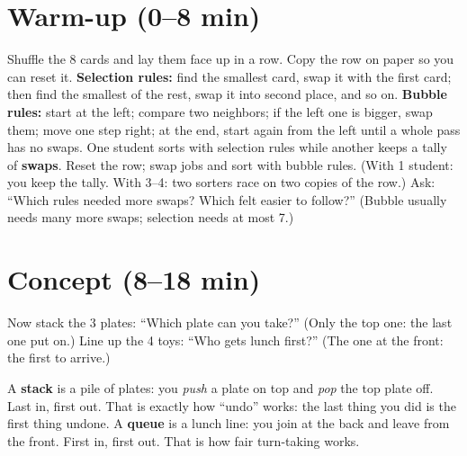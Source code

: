 \section{Warm-up (0--8 min)}
\begin{unplugged}
Shuffle the 8 cards and lay them face up in a row. Copy the row on paper so you can reset it.
\textbf{Selection rules:} find the smallest card, swap it with the first card; then find the smallest of the rest, swap it into second place, and so on.
\textbf{Bubble rules:} start at the left; compare two neighbors; if the left one is bigger, swap them; move one step right; at the end, start again from the left until a whole pass has no swaps.
One student sorts with selection rules while another keeps a tally of \textbf{swaps}. Reset the row; swap jobs and sort with bubble rules. (With 1 student: you keep the tally. With 3--4: two sorters race on two copies of the row.)
Ask: \enquote{Which rules needed more swaps? Which felt easier to follow?} (Bubble usually needs many more swaps; selection needs at most 7.)
\end{unplugged}

\section{Concept (8--18 min)}
Now stack the 3 plates: \enquote{Which plate can you take?} (Only the top one: the last one put on.) Line up the 4 toys: \enquote{Who gets lunch first?} (The one at the front: the first to arrive.)

\begin{analogy}
A \textbf{stack} is a pile of plates: you \emph{push} a plate on top and \emph{pop} the top plate off. Last in, first out. That is exactly how \enquote{undo} works: the last thing you did is the first thing undone.
A \textbf{queue} is a lunch line: you join at the back and leave from the front. First in, first out. That is how fair turn-taking works.
\end{analogy}


